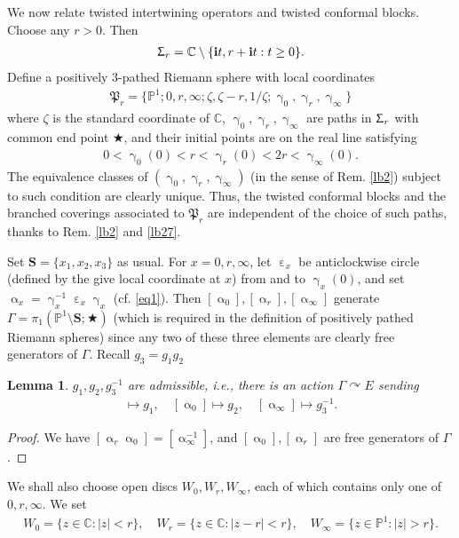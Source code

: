 \documentclass[12pt,a4paper,notitlepage]{article}
\theoremstyle{definition}
\theoremstyle{plain}
\newtheorem{lm}[df]{Lemma}
\newcommand{\fk}{\mathfrak}
\newcommand{\im}{\mathbf{i}}
\newcommand{\Cbb}{\mathbb C}
\newcommand{\Pbb}{\mathbb P}
\newcommand{\Sbf}{\mathbf{S}}
\numberwithin{equation}{subsection}
\begin{document}
We now relate twisted intertwining operators and twisted conformal blocks. Choose any $r>0$. Then
\begin{align*}
\Upsigma_r=\Cbb\setminus\{\im t,r+\im t:t\geq 0\}.	
\end{align*}
Define a positively $3$-pathed Riemann sphere with local coordinates
\begin{align*}
\fk P_r=\{\Pbb^1;0,r,\infty;\zeta,\zeta-r,1/\zeta;\upgamma_0,\upgamma_r,\upgamma_\infty\}	
\end{align*}
where $\zeta$ is the standard coordinate of $\Cbb$, $\upgamma_0,\upgamma_r,\upgamma_\infty$ are paths in $\Upsigma_r$ with common end point $\bigstar$, and their initial points are on the real line satisfying
\begin{align*}
0<\upgamma_0(0)<r<\upgamma_r(0)<2r<\upgamma_\infty(0).	
\end{align*}
The equivalence classes of  $(\upgamma_0,\upgamma_r,\upgamma_\infty)$ (in the sense of Rem. \ref{lb2}) subject to such condition are clearly unique. Thus, the  twisted conformal blocks and the branched coverings associated to $\fk P_r$ are independent of the choice of such paths, thanks to Rem. \ref{lb2} and \ref{lb27}.

Set $\Sbf=\{x_1,x_2,x_3\}$ as usual. For $x=0,r,\infty$, let $\upepsilon_x$ be anticlockwise circle (defined by the give local coordinate at $x$) from and to $\upgamma_x(0)$, and set  $\upalpha_x=\upgamma_x^{-1}\upepsilon_x\upgamma_x$ (cf. \eqref{eq1}). Then $[\upalpha_0],[\upalpha_r],[\upalpha_\infty]$ generate $\Gamma=\pi_1(\Pbb^1\setminus\Sbf;\bigstar)$ (which is required in the definition of positively pathed Riemann spheres) since any two of these three elements are clearly free generators  of $\Gamma$. Recall $g_3=g_1g_2$
\begin{lm}
$g_1,g_2,g_3^{-1}$ are admissible, i.e., there is an action $\Gamma\curvearrowright E$ sending
\begin{align*}
[\upalpha_r]\mapsto g_1,\quad [\upalpha_0]\mapsto g_2,\quad [\upalpha_\infty]\mapsto g_3^{-1}.	
\end{align*}
\end{lm}

\begin{proof}
We have $[\upalpha_r\upalpha_0]=[\upalpha_\infty^{-1}]$, and $[\upalpha_0],[\upalpha_r]$ are free generators of $\Gamma$.
\end{proof}


We shall also choose open discs $W_0,W_r,W_\infty$, each of which contains only one of $0,r,\infty$. We set
\begin{align*}
W_0=\{z\in\Cbb:|z|<r\},\quad W_r=\{z\in\Cbb:|z-r|<r\},\quad W_\infty=\{z\in\Pbb^1:|z|>r\}.
\end{align*}
\end{document}
